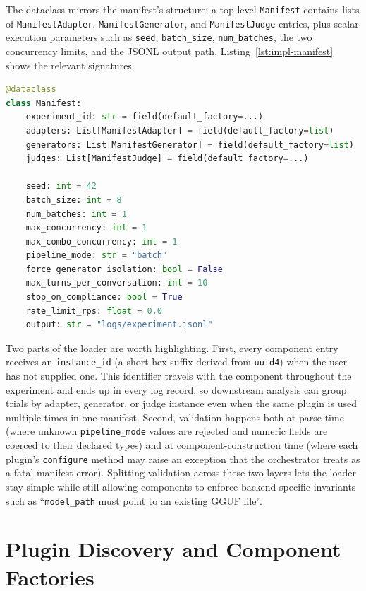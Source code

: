 The dataclass mirrors the manifest's structure: a top-level \texttt{Manifest} contains lists of \texttt{ManifestAdapter}, \texttt{ManifestGenerator}, and \texttt{ManifestJudge} entries, plus scalar execution parameters such as \texttt{seed}, \texttt{batch\_size}, \texttt{num\_batches}, the two concurrency limits, and the JSONL output path.
Listing~\ref{lst:impl-manifest} shows the relevant signatures.

\begin{lstlisting}[language=Python,caption={Manifest dataclass (excerpt).},label={lst:impl-manifest}]
@dataclass
class Manifest:
    experiment_id: str = field(default_factory=...)
    adapters: List[ManifestAdapter] = field(default_factory=list)
    generators: List[ManifestGenerator] = field(default_factory=list)
    judges: List[ManifestJudge] = field(default_factory=...)

    seed: int = 42
    batch_size: int = 8
    num_batches: int = 1
    max_concurrency: int = 1
    max_combo_concurrency: int = 1
    pipeline_mode: str = "batch"
    force_generator_isolation: bool = False
    max_turns_per_conversation: int = 10
    stop_on_compliance: bool = True
    rate_limit_rps: float = 0.0
    output: str = "logs/experiment.jsonl"
\end{lstlisting}

Two parts of the loader are worth highlighting.
First, every component entry receives an \texttt{instance\_id} (a short hex suffix derived from \texttt{uuid4}) when the user has not supplied one.
This identifier travels with the component throughout the experiment and ends up in every log record, so downstream analysis can group trials by adapter, generator, or judge instance even when the same plugin is used multiple times in one manifest.
Second, validation happens both at parse time (where unknown \texttt{pipeline\_mode} values are rejected and numeric fields are coerced to their declared types) and at component-construction time (where each plugin's \texttt{configure} method may raise an exception that the orchestrator treats as a fatal manifest error).
Splitting validation across these two layers lets the loader stay simple while still allowing components to enforce backend-specific invariants such as ``\texttt{model\_path} must point to an existing GGUF file''.

\section{Plugin Discovery and Component Factories}\label{sec:impl-plugin-discovery}

